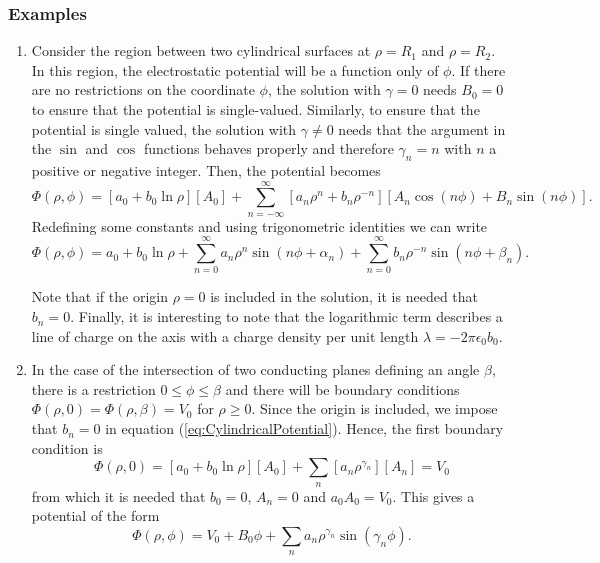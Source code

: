 \subsubsection{Examples}
\begin{enumerate}
\item Consider the region between two cylindrical surfaces at $\rho = R_1$ and $\rho = R_2$. In this region, the electrostatic potential will be a function only of $\phi$. If there are no restrictions on the coordinate $\phi$, the solution with $\gamma = 0$ needs $B_0 =0$ to ensure that the potential is single-valued. Similarly, to ensure  that the potential is single valued, the solution with $\gamma \neq 0$ needs that the argument in the $\sin$ and $\cos$ functions behaves properly and therefore $\gamma_n = n$ with $n$ a positive or negative integer. Then, the potential becomes
\begin{equation}
\Phi (\rho, \phi) = \left[ a_0  + b_0 \ln \rho \right]\left[ A_0  \right] + \sum_{n=-\infty} ^\infty \left[ a_n \rho^{n} + b_n \rho^{-n} \right] \left[ A_n \cos (n \phi ) + B_n \sin (n \phi ) \right].
\end{equation}
Redefining some constants and using trigonometric identities we can write 
\begin{equation}
\Phi (\rho, \phi) =  a_0  + b_0 \ln \rho + \sum_{n = 0} ^\infty    a_n \rho^{n} \sin (n\phi + \alpha _n) +  \sum_{n=0} ^\infty  b_n \rho^{-n}  \sin (n \phi + \beta _n ).
\end{equation}

Note that if the origin $\rho = 0 $ is included in the solution, it is needed that $b_n = 0$. Finally,  it is interesting to note that the logarithmic term describes a line of charge on the axis with a charge density per unit length $\lambda = -2\pi \epsilon_0 b_0$.

\item In the case of the intersection of two conducting planes defining an angle $\beta$, there is a restriction $0\leq \phi \leq \beta $ and there will be boundary conditions $\Phi(\rho, 0) = \Phi(\rho, \beta) = V_0$ for $\rho \geq 0 $. Since the origin is included, we impose that $b_n = 0$ in equation (\ref{eq:CylindricalPotential}). Hence, the first boundary condition is
\begin{equation}
\Phi (\rho, 0) = \left[ a_0  + b_0 \ln \rho \right]\left[ A_0 \right] + \sum_n \left[ a_n \rho^{\gamma_n} \right] \left[ A_n  \right] = V_0
\end{equation}
from which it is needed that $b_0 = 0$, $A_n = 0$ and $ a_0 A_0 = V_0$. This gives a potential of the form
\begin{equation}
\Phi (\rho, \phi) = V_0  + B_0  \phi  + \sum_n a_n \rho^{\gamma_n}  \sin (\gamma_n \phi ).
\end{equation}


\end{enumerate}
